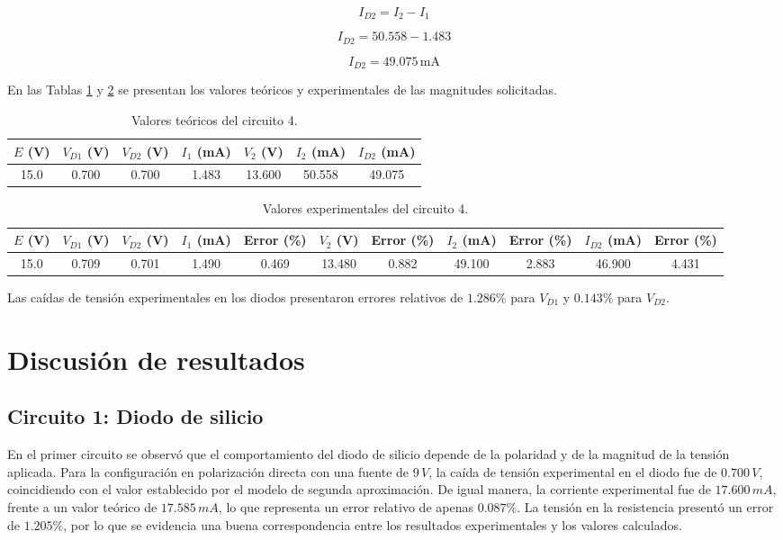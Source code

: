\[
I_{D2}=I_2-I_1
\]

\[
I_{D2}=50.558-1.483
\]

\[
\boxed{I_{D2}=49.075\,\text{mA}}
\]

\vspace{0.3cm}

En las Tablas \ref{tab:c4_teoricos} y \ref{tab:c4_experimentales} se presentan los valores teóricos y experimentales de las magnitudes solicitadas.

\begin{table}[H]
\centering
\caption{Valores teóricos del circuito 4.}
\label{tab:c4_teoricos}
\scriptsize
\begin{tabular}{c c c c c c c}
\hline
\(E\) (V) & \(V_{D1}\) (V) & \(V_{D2}\) (V) &
\(I_1\) (mA) & \(V_2\) (V) &
\(I_2\) (mA) & \(I_{D2}\) (mA) \\
\hline
15.0 & 0.700 & 0.700 & 1.483 & 13.600 & 50.558 & 49.075 \\
\hline
\end{tabular}
\end{table}

\begin{table}[H]
\centering
\caption{Valores experimentales del circuito 4.}
\label{tab:c4_experimentales}
\scriptsize
\begin{tabular}{c c c c c c c c c c c}
\hline
\(E\) (V) &
\(V_{D1}\) (V) & \(V_{D2}\) (V) &
\(I_1\) (mA) & \textbf{Error (\%)} &
\(V_2\) (V) & \textbf{Error (\%)} &
\(I_2\) (mA) & \textbf{Error (\%)} &
\(I_{D2}\) (mA) & \textbf{Error (\%)} \\
\hline
15.0 & 0.709 & 0.701 & 1.490 & 0.469 &
13.480 & 0.882 & 49.100 & 2.883 &
46.900 & 4.431 \\
\hline
\end{tabular}
\end{table}

\noindent
Las caídas de tensión experimentales en los diodos presentaron errores relativos de \(1.286\%\) para \(V_{D1}\) y \(0.143\%\) para \(V_{D2}\).

\section{Discusión de resultados}

\subsection{Circuito 1: Diodo de silicio}

En el primer circuito se observó que el comportamiento del diodo de silicio depende de la polaridad y de la magnitud de la tensión aplicada. Para la configuración en polarización directa con una fuente de \(9\,V\), la caída de tensión experimental en el diodo fue de \(0.700\,V\), coincidiendo con el valor establecido por el modelo de segunda aproximación. De igual manera, la corriente experimental fue de \(17.600\,mA\), frente a un valor teórico de \(17.585\,mA\), lo que representa un error relativo de apenas \(0.087\%\). La tensión en la resistencia presentó un error de \(1.205\%\), por lo que se evidencia una buena correspondencia entre los resultados experimentales y los valores calculados.

